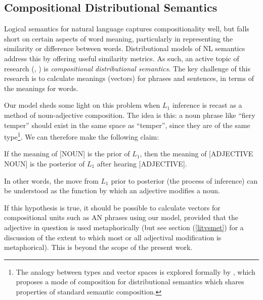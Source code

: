 \documentclass[10pt,letterpaper,twocolumn]{article}
\begin{document}





\subsection{Compositional Distributional Semantics}

Logical semantics for natural language captures compositionality well, but falls short on certain aspects of word meaning, particularly in representing the similarity or difference between words. Distributional models of NL semantics address this by offering useful similarity metrics. As such, an active topic of research (\cite{socher2013recursive}, \cite{coecke2010mathematical}) is \emph{compositional distributional semantics}. The key challenge of this research is to calculate meanings (vectors) for phrases and sentences, in terms of the meanings for words.

Our model sheds some light on this problem when $L_1$ inference is recast as a method of noun-adjective composition. The idea is this: a noun phrase like ``fiery temper'' should exist in the same space as ``temper'', since they are of the same type\footnote{The analogy between types and vector spaces is explored formally by \cite{coecke2010mathematical}, which proposes a mode of composition for distributional semantics which shares properties of standard semantic composition.}. We can therefore make the following claim:
\begin{exe}
\ex If the meaning of [NOUN] is the prior of $L_1$, then the meaning of [ADJECTIVE NOUN] is the posterior of $L_1$ after hearing [ADJECTIVE]. \label{prop1}
\end{exe}

In other words, the move from $L_1$ prior to posterior (the process of inference) can be understood as the function by which an adjective modifies a noun.

If this hypothesis is true, it should be possible to calculate vectors for compositional units such as AN phrases using our model, provided that the adjective in question is used metaphorically (but see section (\ref{litvsmet}) for a discussion of the extent to which most or all adjectival modification is metaphorical). This is beyond the scope of the present work.
\end{document}
